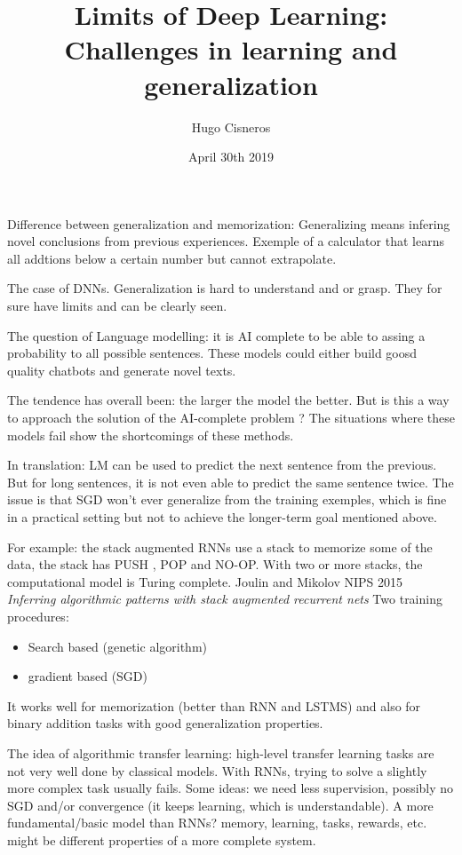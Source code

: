 \documentclass{article}
\title{Limits of Deep Learning: Challenges in learning and generalization}
\author{Hugo Cisneros}
\date{April 30th 2019}
\begin{document}
\maketitle

Difference between generalization and memorization:
Generalizing means infering novel conclusions from previous experiences. Exemple
of a calculator that learns all addtions below a certain number but cannot
extrapolate.

The case of DNNs. Generalization is hard to understand and or grasp.
They for sure have limits and can be clearly seen.

The question of Language modelling: it is AI complete to be able to assing a
probability to all possible sentences. These models could either build goosd
quality chatbots and generate novel texts.

The tendence has overall been: the larger the model the better. But is this a
way to approach the solution of the AI-complete problem ? The situations where
these models fail show the shortcomings of these methods.

In translation: LM can be used to predict the next sentence from the previous.
But for long sentences, it is not even able to predict the same sentence twice.
The issue is that SGD won't ever generalize from the training exemples, which is
fine in a practical setting but not to achieve the longer-term goal mentioned
above.

For example: the stack augmented RNNs use a stack to memorize some of the data,
the stack has PUSH , POP and NO-OP. With two or more stacks, the computational
model is Turing complete. Joulin and Mikolov NIPS 2015 \textit{Inferring
  algorithmic patterns with stack augmented recurrent nets}
Two training procedures:
\begin{itemize}
\item Search based (genetic algorithm)
  \item gradient based (SGD)
\end{itemize}
It works well for memorization (better than RNN and LSTMS) and also for binary
addition tasks with good generalization properties.

The idea of algorithmic transfer learning:
high-level transfer learning tasks are not very well done by classical models.
With RNNs, trying to solve a slightly more complex task usually fails. Some
ideas: we need less supervision, possibly no SGD and/or convergence (it keeps
learning, which is understandable). A more fundamental/basic model than RNNs?
memory, learning, tasks, rewards, etc. might be different properties of a more
complete system.
\end{document}
